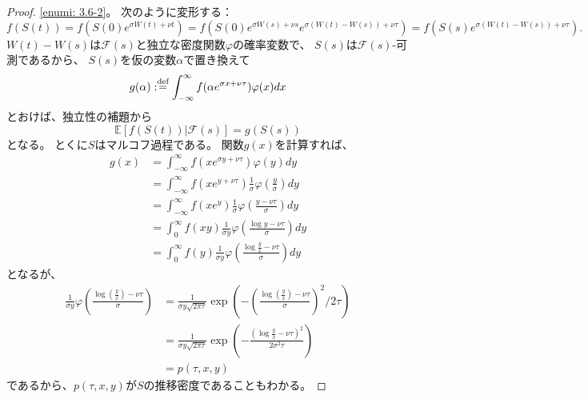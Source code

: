 \documentclass[uplatex]{jsarticle}
\theoremstyle{definition}
\def\E{\mathbb{E}}
\def\mcF{\mathcal{F}}
\def\dfn{:\overset{\mbox{{\scriptsize def}}}{=}}
\begin{document}
\begin{proof}
  \ref{enumi: 3.6-2}。
  次のように変形する：
  \[
  f(S(t)) = f(S(0)e^{\sigma W(t) + \nu t})
  = f(S(0)e^{\sigma W(s)+\nu s}e^{\sigma(W(t)-W(s)) + \nu\tau})
  = f(S(s)e^{\sigma(W(t)-W(s)) + \nu\tau}).
  \]
  \(W(t)-W(s)\)は\(\mcF(s)\)と独立な密度関数\(\varphi\)の確率変数で、
  \(S(s)\)は\(\mcF(s)\)-可測であるから、
  \(S(s)\)を仮の変数\(\alpha\)で置き換えて
  \[
  g(\alpha) \dfn
  \int_{-\infty}^{\infty}f(\alpha e^{\sigma x + \nu\tau})\varphi(x)dx
  \]
  とおけば、独立性の補題から
  \[
  \E[f(S(t))|\mcF(s)] = g(S(s))
  \]
  となる。
  とくに\(S\)はマルコフ過程である。
  関数\(g(x)\)を計算すれば、
  \begin{align*}
    g(x) &= \int_{-\infty}^{\infty}f(xe^{\sigma y + \nu\tau})\varphi(y)dy \\
    &= \int_{-\infty}^{\infty}
    f(xe^{y + \nu\tau})\frac{1}{\sigma}
    \varphi\left(\frac{y}{\sigma}\right)dy \\
    &= \int_{-\infty}^{\infty}
    f(xe^y)\frac{1}{\sigma}
    \varphi\left(\frac{y - \nu\tau}{\sigma}\right)dy \\
    &= \int_0^{\infty}f(xy)\frac{1}{\sigma y}
    \varphi\left(\frac{\log y - \nu\tau}{\sigma} \right)dy \\
    &= \int_0^{\infty}f(y)\frac{1}{\sigma y}
    \varphi\left(\frac{\log \frac{y}{x} - \nu\tau}{\sigma}
    \right)dy
  \end{align*}
  となるが、
  \begin{align*}
    \frac{1}{\sigma y}
    \varphi\left(\frac{\log \left(\frac{y}{x}\right) - \nu\tau}{\sigma}
    \right)
    &= \frac{1}{\sigma y\sqrt{2\pi\tau}}
    \exp\left( -\left(\frac{\log \left(\frac{y}{x}\right) - \nu\tau}{\sigma}
    \right)^2/2\tau \right) \\
    &= \frac{1}{\sigma y\sqrt{2\pi\tau}}
    \exp\left( -\frac{\left(\log \frac{y}{x} -
    \nu\tau\right)^2}{2\sigma^2\tau}\right) \\
    &= p(\tau,x,y)
  \end{align*}
  であるから、\(p(\tau,x,y)\)が\(S\)の推移密度であることもわかる。
\end{proof}
\end{document}
